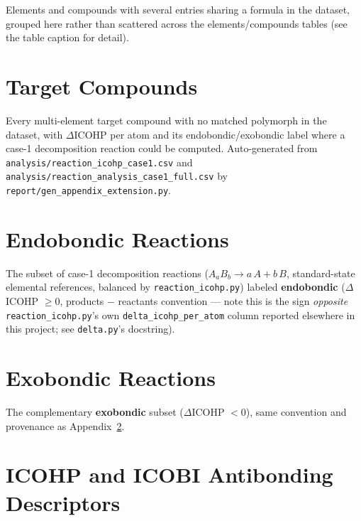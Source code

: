 \documentclass[11pt,a4paper]{article}
\begin{document}
Elements and compounds with several entries sharing a formula in the
dataset, grouped here rather than scattered across the elements/compounds
tables (see the table caption for detail).

{\small

}

\section{Target Compounds}
\label{sec:appendix-ext-compounds}

Every multi-element target compound with no matched polymorph in the
dataset, with $\Delta$ICOHP per atom and its endobondic/exobondic label
where a case-1 decomposition reaction could be computed. Auto-generated
from \texttt{analysis/reaction\_icohp\_case1.csv} and
\texttt{analysis/reaction\_analysis\_case1\_full.csv} by
\texttt{report/gen\_appendix\_extension.py}.

{\small

}

\section{Endobondic Reactions}
\label{sec:appendix-ext-endobondic}

The subset of case-1 decomposition reactions
($A_aB_b \to a\,A + b\,B$, standard-state elemental references, balanced
by \texttt{reaction\_icohp.py}) labeled \textbf{endobondic}
($\Delta$ICOHP $\geq 0$, products $-$ reactants convention --- note this
is the sign \emph{opposite} \texttt{reaction\_icohp.py}'s own
\texttt{delta\_icohp\_per\_atom} column reported elsewhere in this
project; see \texttt{delta.py}'s docstring).

{\small

}

\section{Exobondic Reactions}
\label{sec:appendix-ext-exobondic}

The complementary \textbf{exobondic} subset ($\Delta$ICOHP $< 0$), same
convention and provenance as Appendix~\ref{sec:appendix-ext-endobondic}.

{\small

}

\section{ICOHP and ICOBI Antibonding Descriptors}
\label{sec:appendix-icobi-antibonding}
\end{document}
